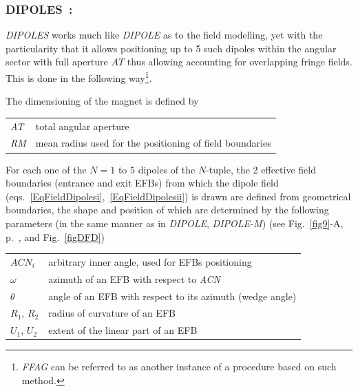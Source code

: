 \newpage

\subsubsection*{DIPOLES~: \DIPOLESTitl~\cite{reportNIMFFAG,reportICFAFFAG}} \label{DIPOLES} 
\medskip

\noindent \textsl{DIPOLES} works much like \textsl{DIPOLE} 
as to the field modelling, yet with the particularity that it allows positioning up to 5 such 
dipoles within the angular sector with full aperture $AT$ thus allowing 
accounting for overlapping fringe fields. 
This is done in the following 
way\footnote{\textsl{FFAG} can be referred to as another instance of a procedure based on such method.}. 

\bigskip

\noindent  The dimensioning of the magnet is defined by

\bigskip

 \begin{tabular}{>{\sl}l!{~:}l}
	 AT &  total angular aperture \\
	 RM & mean radius used for the positioning of field boundaries\\
 \end{tabular}

\bigskip

\noindent For each one of the $N=1$ to $5$ dipoles of the  $N$-tuple, 
the 2 effective field boundaries (entrance and exit EFBs) from which  the dipole field  
 (eqs.~\ref{EqFieldDipolesi},~\ref{EqFieldDipolesii})  is drawn are
defined from geometrical  boundaries, the shape and position of which are determined by the 
following parameters (in the same manner as in \textsl{DIPOLE}, \textsl{DIPOLE-M})
 (see Fig.~\ref{fig9}-A, p.~\pageref{fig9}, and Fig.~\ref{figDFD}) 

\bigskip

\begin{tabular}{l!{~:}l}
	$ACN_i$  & arbitrary inner angle, used for EFBs positioning  \\
	$\omega$ &  azimuth of an EFB with respect to  \textsl{ACN}\\
	$\theta$ & angle of an EFB with respect to its azimuth (wedge angle)\\ 
	$R_1$, $R_2$  &  radius of curvature of an EFB\\
	$U_1$, $U_2$  &  extent of the linear part of an EFB  \\
\end{tabular}

